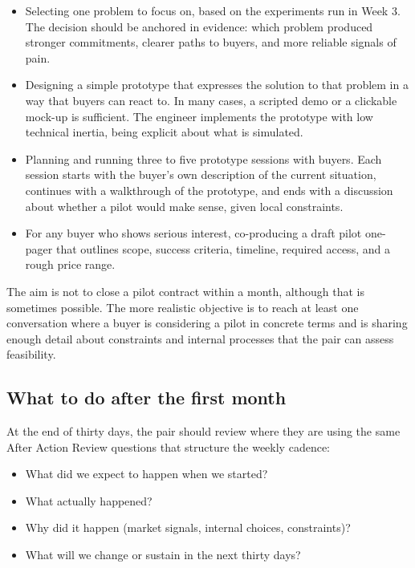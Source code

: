 \documentclass[10pt, a4paper, twocolumn]{article} %
\begin{document}
\begin{itemize}
  \item Selecting one problem to focus on, based on the experiments run in Week 3. The decision should be anchored in evidence: which problem produced stronger commitments, clearer paths to buyers, and more reliable signals of pain.
  \item Designing a simple prototype that expresses the solution to that problem in a way that buyers can react to. In many cases, a scripted demo or a clickable mock-up is sufficient. The engineer implements the prototype with low technical inertia, being explicit about what is simulated.
  \item Planning and running three to five prototype sessions with buyers. Each session starts with the buyer’s own description of the current situation, continues with a walkthrough of the prototype, and ends with a discussion about whether a pilot would make sense, given local constraints.
  \item For any buyer who shows serious interest, co-producing a draft pilot one-pager that outlines scope, success criteria, timeline, required access, and a rough price range.
\end{itemize}

The aim is not to close a pilot contract within a month, although that is sometimes possible. The more realistic objective is to reach at least one conversation where a buyer is considering a pilot in concrete terms and is sharing enough detail about constraints and internal processes that the pair can assess feasibility.

\newpage
\subsection{What to do after the first month}

At the end of thirty days, the pair should review where they are using the same After Action Review questions that structure the weekly cadence:

\begin{itemize}
  \item What did we expect to happen when we started?
  \item What actually happened?
  \item Why did it happen (market signals, internal choices, constraints)?
  \item What will we change or sustain in the next thirty days?
\end{itemize}
\end{document}
